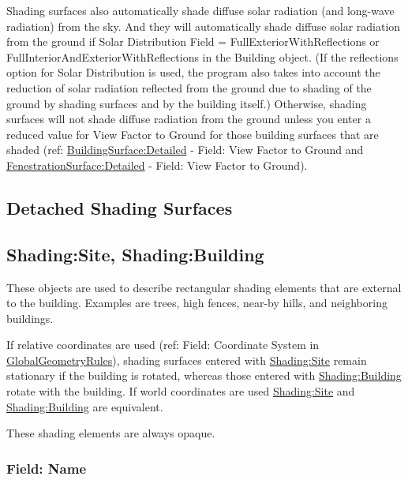 Shading surfaces also automatically shade diffuse solar radiation (and long-wave radiation) from the sky. And they will automatically shade diffuse solar radiation from the ground if Solar Distribution Field = FullExteriorWithReflections or FullInteriorAndExteriorWithReflections in the Building object. (If the reflections option for Solar Distribution is used, the program also takes into account the reduction of solar radiation reflected from the ground due to shading of the ground by shading surfaces and by the building itself.) Otherwise, shading surfaces will not shade diffuse radiation from the ground unless you enter a reduced value for View Factor to Ground for those building surfaces that are shaded (ref: \hyperref[buildingsurfacedetailed]{BuildingSurface:Detailed} - Field: View Factor to Ground and \hyperref[fenestrationsurfacedetailed]{FenestrationSurface:Detailed} - Field: View Factor to Ground).

\subsection{Detached Shading Surfaces}\label{detached-shading-surfaces}

\subsection{Shading:Site, Shading:Building}\label{shadingsite-shadingbuilding}

These objects are used to describe rectangular shading elements that are external to the building. Examples are trees, high fences, near-by hills, and neighboring buildings.

If relative coordinates are used (ref: Field: Coordinate System in \hyperref[globalgeometryrules]{GlobalGeometryRules}), shading surfaces entered with \hyperref[shadingsite-shadingbuilding]{Shading:Site} remain stationary if the building is rotated, whereas those entered with \hyperref[shadingsite-shadingbuilding]{Shading:Building} rotate with the building. If world coordinates are used \hyperref[shadingsite-shadingbuilding]{Shading:Site} and \hyperref[shadingsite-shadingbuilding]{Shading:Building} are equivalent.

These shading elements are always opaque.

\subsubsection{Field: Name}\label{field-name-22-004}


